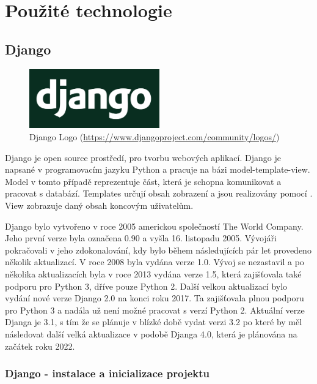 \chapter{Použité technologie}
\label{2-technologie}

\section{Django}

\begin{figure}[H] \centering
  \includegraphics[width=160pt]{./pictures/django-logo.png}
    \caption[Django Logo]{Django Logo (\url{https://www.djangoproject.com/community/logos/})}
	\label{fig:Django Logo}                                
\end{figure}

Django je open source prostředí, pro tvorbu webových aplikací. Django
je napsané v programovacím jazyku Python a pracuje na bázi
model-template-view. Model v tomto případě reprezentuje část, která je
schopna komunikovat a pracovat s databází. Templates určují obsah
zobrazení a jsou realizovány pomocí . View zobrazuje daný obsah
koncovým uživatelům.

Django bylo vytvořeno v roce 2005 americkou společností The World
Company. Jeho první verze byla označena 0.90 a vyšla 16. listopadu
2005. Vývojáři pokračovali v jeho zdokonalování, kdy bylo během
následujících pár let provedeno několik aktualizací. V roce 2008 byla
vydána verze 1.0. Vývoj se nezastavil a po několika aktualizacích byla v
roce 2013 vydána verze 1.5, která zajišťovala také podporu pro
Python 3, dříve pouze Python 2. Další velkou aktualizací bylo vydání nové
verze Django 2.0 na konci roku 2017. Ta zajišťovala plnou podporu pro
Python 3 a nadála už není možné pracovat s verzí Python 2. Aktuální
verze Djanga je 3.1, s tím že se plánuje v blízké době vydat verzi 3.2
po které by měl následovat další velká aktualizace v podobě Djanga 4.0,
která je plánována na začátek roku 2022. \cite{django}

\newpage


\subsection{Django - instalace a inicializace projektu}

